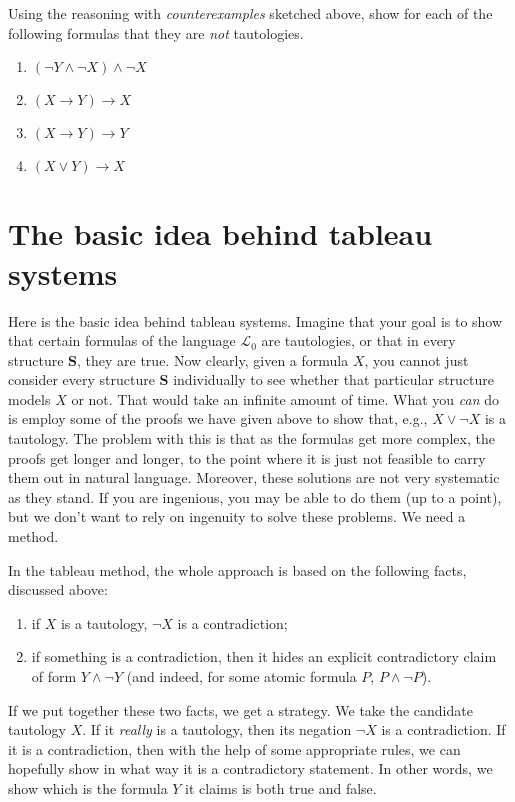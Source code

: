 \begin{exc}
Using the reasoning with \textit{counterexamples} sketched above, show for each of the following formulas that they are \textit{not} tautologies. 

\begin{enumerate}
	\item $(\neg Y \wedge \neg X) \wedge \neg X$
	\item $(X \rightarrow Y) \rightarrow X$
	\item $(X \rightarrow Y) \rightarrow Y$
	\item $(X \vee Y) \rightarrow X$
\end{enumerate}
\end{exc}


\section{The basic idea behind tableau systems}

Here is the basic idea behind tableau systems. Imagine that your goal is to show that certain formulas of the language $\mathcal{L}_0$ are tautologies, or that in every structure $\mathbf{S}$, they are true. Now clearly, given a formula $X$, you cannot just consider every structure $\mathbf{S}$ individually to see whether that particular structure models $X$ or not. That would take an infinite amount of time. What you \textit{can} do is employ some of the proofs we have given above to show that, e.g., $X \vee \neg X$ is a tautology. The problem with this is that as the formulas get more complex, the proofs get longer and longer, to the point where it is just not feasible to carry them out in natural language. Moreover, these solutions are not very systematic as they stand. If you are ingenious, you may be able to do them (up to a point), but we don't want to rely on ingenuity to solve these problems. We need a method.  

In the tableau method, the whole approach is based on the following facts, discussed above:

\begin{enumerate}
	\item if $X$ is a tautology, $\neg X$ is a contradiction;
	\item if something is a contradiction, then it hides an explicit contradictory claim of form $Y \wedge \neg Y$ (and indeed, for some atomic formula $P$, $P \wedge \neg P$).
\end{enumerate}

If we put together these two facts, we get a strategy. We take the candidate tautology $X$. If it \textit{really} is a tautology, then its negation $\neg X$ is a contradiction. If it is a contradiction, then with the help of some appropriate rules, we can hopefully show in what way it is a contradictory statement. In other words, we show which is the formula $Y$ it claims is both true and false. 

